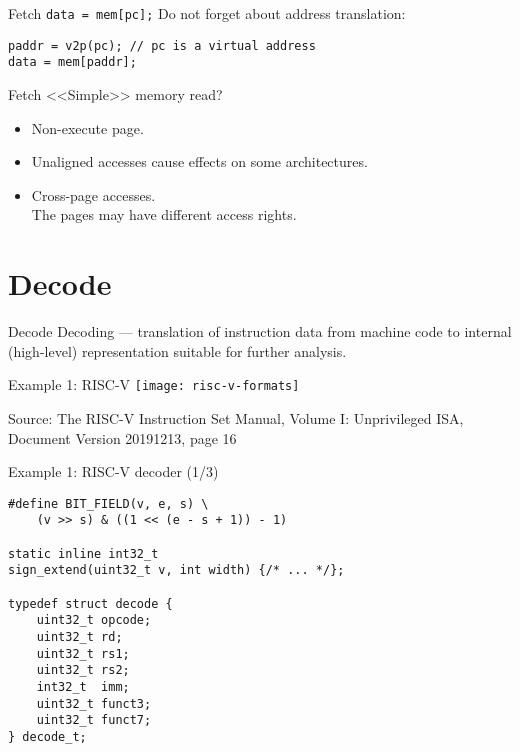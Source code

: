 \begin{frame}[fragile]{Fetch}
\texttt{data = mem[pc];}\pause
\vfill
Do not forget about address translation:
\begin{lstlisting}
paddr = v2p(pc); // pc is a virtual address
data = mem[paddr];
\end{lstlisting}
\end{frame}

\begin{frame}{Fetch}
<<Simple>> memory read?
\pause\bigskip
\begin{itemize}
\item Non-execute page.
\pause\bigskip
\item Unaligned accesses cause effects on some architectures.
\pause\bigskip
\item Cross-page accesses. \\
The pages may have different access rights.
\end{itemize}
\end{frame}

\section{Decode}

\begin{frame}{Decode}
Decoding --- translation of instruction data from machine code to internal
(high-level) representation suitable for further analysis.
\end{frame}

\begin{frame}{Example 1: RISC-V}
\centering
\texttt{[image: risc-v-formats]}

\tiny{Source: The RISC-V Instruction Set Manual, Volume I: Unprivileged ISA,
      Document Version 20191213, page 16}
\end{frame}

\begin{frame}[fragile]{Example 1: RISC-V decoder (1/3)}
\begin{lstlisting}
#define BIT_FIELD(v, e, s) \
    (v >> s) & ((1 << (e - s + 1)) - 1)

static inline int32_t
sign_extend(uint32_t v, int width) {/* ... */};

typedef struct decode {
    uint32_t opcode;
    uint32_t rd;
    uint32_t rs1;
    uint32_t rs2;
    int32_t  imm;
    uint32_t funct3;
    uint32_t funct7;
} decode_t;
\end{lstlisting}
\end{frame}

